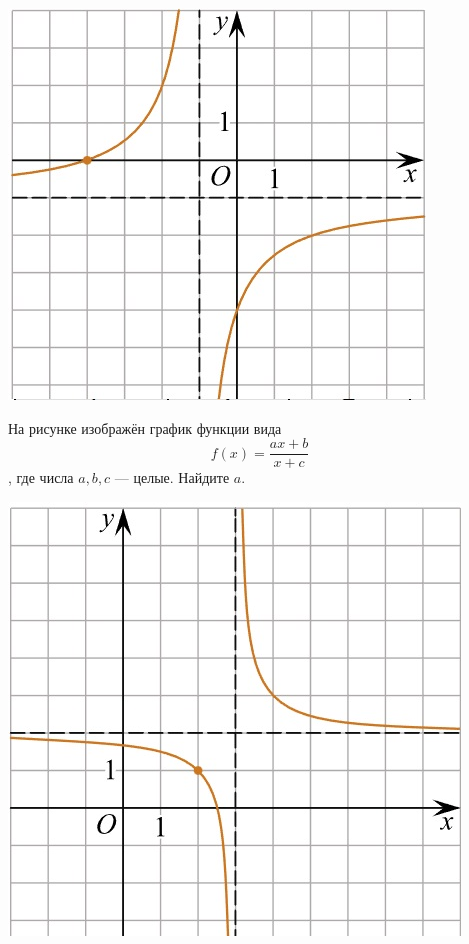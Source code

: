 \begin{class}[number=5]
\begin{listofex}
\begin{minipage}[t]{0.22\textwidth}
			\includegraphics[align=t, width=\textwidth]{pics/G101M4C5-3.jpg}
		\end{minipage}
		\item
		\begin{minipage}[t]{0.66\textwidth}
			На рисунке изображён график функции вида \[ f(x)=\dfrac{ax+b}{x+c} \], где числа \(a, b, c\) --- целые. Найдите \(a\).
		\end{minipage}
		\hspace{0.05\textwidth}
		\begin{minipage}[t]{0.22\textwidth}
			\includegraphics[align=t, width=\textwidth]{pics/G101M4C5-4.jpg}

\end{minipage}
\end{listofex}
\end{class}
